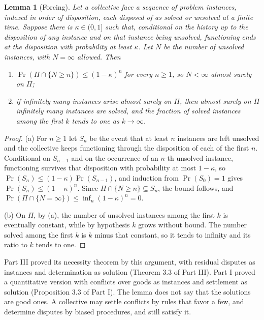 \documentclass[11pt,letterpaper]{article}
\newtheorem{lemma}[theorem]{Lemma}
\theoremstyle{definition}
\theoremstyle{remark}
\begin{document}
\begin{lemma}[Forcing]
\label{lem:formalized-state:forcing}
Let a collective face a sequence of problem instances, indexed in order of disposition, each disposed of as solved or unsolved at a finite time. Suppose there is $\kappa\in(0,1]$ such that, conditional on the history up to the disposition of any instance and on that instance being unsolved, functioning ends at the disposition with probability at least $\kappa$. Let $N$ be the number of unsolved instances, with $N=\infty$ allowed. Then
\begin{enumerate}[label=(\alph*)]
\item $\Pr(\Pi\cap\{N\ge n\})\le(1-\kappa)^n$ for every $n\ge1$, so $N<\infty$ almost surely on $\Pi$;
\item if infinitely many instances arise almost surely on $\Pi$, then almost surely on $\Pi$ infinitely many instances are solved, and the fraction of solved instances among the first $k$ tends to one as $k\to\infty$.
\end{enumerate}
\end{lemma}

\begin{proof}
(a) For $n\ge1$ let $S_n$ be the event that at least $n$ instances are left unsolved and the collective keeps functioning through the disposition of each of the first $n$. Conditional on $S_{n-1}$ and on the occurrence of an $n$-th unsolved instance, functioning survives that disposition with probability at most $1-\kappa$, so $\Pr(S_n)\le(1-\kappa)\Pr(S_{n-1})$, and induction from $\Pr(S_0)=1$ gives $\Pr(S_n)\le(1-\kappa)^n$. Since $\Pi\cap\{N\ge n\}\subseteq S_n$, the bound follows, and $\Pr(\Pi\cap\{N=\infty\})\le\inf_n(1-\kappa)^n=0$.

(b) On $\Pi$, by (a), the number of unsolved instances among the first $k$ is eventually constant, while by hypothesis $k$ grows without bound. The number solved among the first $k$ is $k$ minus that constant, so it tends to infinity and its ratio to $k$ tends to one.
\end{proof}

Part III proved its necessity theorem by this argument, with residual disputes as instances and determination as solution (Theorem 3.3 of Part III). Part I proved a quantitative version with conflicts over goods as instances and settlement as solution (Proposition 3.3 of Part I). The lemma does not say that the solutions are good ones. A collective may settle conflicts by rules that favor a few, and determine disputes by biased procedures, and still satisfy it.
\end{document}
